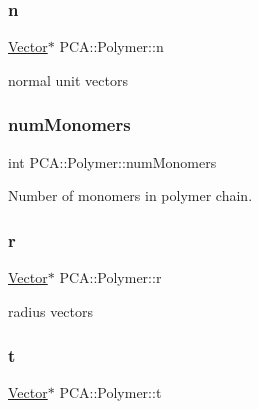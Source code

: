 \subsubsection{\texorpdfstring{n}{n}}
{\footnotesize\ttfamily \hyperlink{class_p_c_a_1_1_vector}{Vector}$\ast$ P\+C\+A\+::\+Polymer\+::n\hspace{0.3cm}{\ttfamily [protected]}}



normal unit vectors 

\hypertarget{class_p_c_a_1_1_polymer_a8dadd2d6d6d65b79909f274acd63fd1e}{}\label{class_p_c_a_1_1_polymer_a8dadd2d6d6d65b79909f274acd63fd1e} 
\subsubsection{\texorpdfstring{num\+Monomers}{numMonomers}}
{\footnotesize\ttfamily int P\+C\+A\+::\+Polymer\+::num\+Monomers\hspace{0.3cm}{\ttfamily [protected]}}



Number of monomers in polymer chain. 

\hypertarget{class_p_c_a_1_1_polymer_a9822e3b9c3420a04a689706b84e586ca}{}\label{class_p_c_a_1_1_polymer_a9822e3b9c3420a04a689706b84e586ca} 
\subsubsection{\texorpdfstring{r}{r}}
{\footnotesize\ttfamily \hyperlink{class_p_c_a_1_1_vector}{Vector}$\ast$ P\+C\+A\+::\+Polymer\+::r\hspace{0.3cm}{\ttfamily [protected]}}



radius vectors 

\hypertarget{class_p_c_a_1_1_polymer_a0fd79e19a8c09a9e4c72903924151b5e}{}\label{class_p_c_a_1_1_polymer_a0fd79e19a8c09a9e4c72903924151b5e} 
\subsubsection{\texorpdfstring{t}{t}}
{\footnotesize\ttfamily \hyperlink{class_p_c_a_1_1_vector}{Vector}$\ast$ P\+C\+A\+::\+Polymer\+::t\hspace{0.3cm}{\ttfamily [protected]}}



